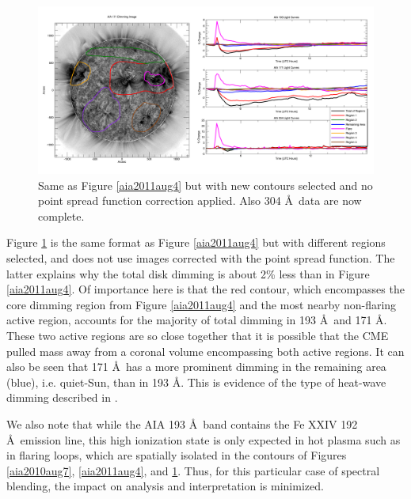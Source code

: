 \begin{figure}[!h]
    \begin{center}
	    \includegraphics[width=166mm]{Images/Aia2011Aug4NewRegions.png}
    \end{center}
    \caption[Additional AIA contour analysis for 2011 August 4 event]{
        Same as Figure \ref{aia2011aug4} but with new contours selected and no point spread function correction applied. 
        Also 304 \AA\ data are now complete. 
	}
    \label{aia2011aug4newregions}
\end{figure}

Figure \ref{aia2011aug4newregions} is the same format as Figure \ref{aia2011aug4} but with different regions selected, and does not use images corrected with the point spread function. The latter explains why the total disk dimming is about 2\% less than in Figure \ref{aia2011aug4}. Of importance here is that the red contour, which encompasses the core dimming region from Figure \ref{aia2011aug4} and the most nearby non-flaring active region, accounts for the majority of total dimming in 193 \AA\ and 171 \AA. These two active regions are so close together that it is possible that the CME pulled mass away from a coronal volume encompassing both active regions. It can also be seen that 171 \AA\ has a more prominent dimming in the remaining area (blue), i.e. quiet-Sun, than in 193 \AA. This is evidence of the type of heat-wave dimming described in \citet{Robbrecht2010}. 

We also note that while the AIA 193 \AA\ band contains the Fe XXIV 192 \AA\ emission line, this high ionization state is only expected in hot plasma such as in flaring loops, which are spatially isolated in the contours of Figures \ref{aia2010aug7}, \ref{aia2011aug4}, and \ref{aia2011aug4newregions}. Thus, for this particular case of spectral blending, the impact on analysis and interpretation is minimized. 

